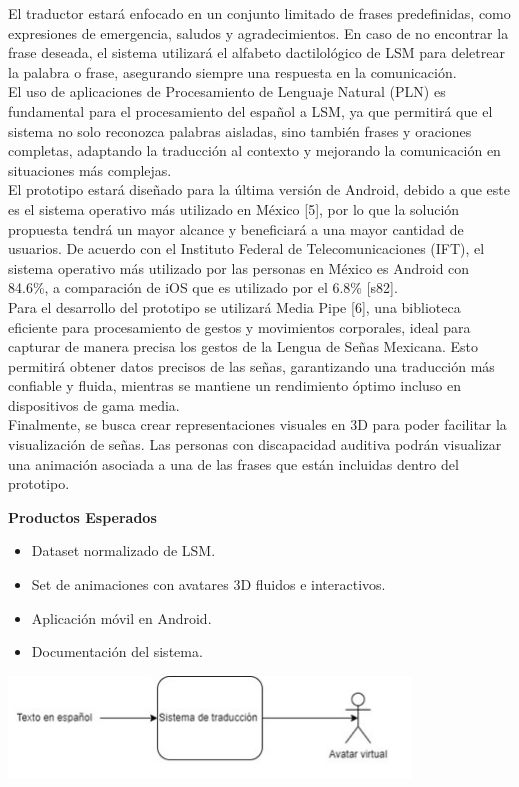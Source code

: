El traductor estará enfocado en un conjunto limitado de frases predefinidas, como expresiones de emergencia, saludos y agradecimientos. En caso de no encontrar la frase deseada, el sistema utilizará el alfabeto dactilológico de LSM para deletrear la palabra o frase, asegurando siempre una respuesta en la comunicación.\\

El uso de aplicaciones de Procesamiento de Lenguaje Natural (PLN) es fundamental para el procesamiento del español a LSM, ya que permitirá que el sistema no solo reconozca palabras aisladas, sino también frases y oraciones completas, adaptando la traducción al contexto y mejorando la comunicación en situaciones más complejas.\\

El prototipo estará diseñado para la última versión de Android, debido a que este es el sistema operativo más utilizado en México [5], por lo que la solución propuesta tendrá un mayor alcance y beneficiará a una mayor cantidad de usuarios. De acuerdo con el Instituto Federal de Telecomunicaciones (IFT), el sistema operativo más utilizado por las personas en México es Android con 84.6\%, a comparación de iOS que es utilizado por el 6.8\% [s82].\\

Para el desarrollo del prototipo se utilizará Media Pipe [6], una biblioteca eficiente para procesamiento de gestos y movimientos corporales, ideal para capturar de manera precisa los gestos de la Lengua de Señas Mexicana. Esto permitirá obtener datos precisos de las señas, garantizando una traducción más confiable y fluida, mientras se mantiene un rendimiento óptimo incluso en dispositivos de gama media.\\

Finalmente, se busca crear representaciones visuales en 3D para poder facilitar la visualización de señas. Las personas con discapacidad auditiva podrán visualizar una animación asociada a una de las frases que están incluidas dentro del prototipo.
\newline

\textbf{Productos Esperados}
\begin{itemize}
    \item Dataset normalizado de LSM.
    \item Set de animaciones con avatares 3D fluidos e interactivos.
    \item Aplicación móvil en Android.
    \item Documentación del sistema.
\end{itemize}
\begin{center}
    \includegraphics[width=0.8\textwidth]{Images/diacajanegra.jpg}
\end{center}


